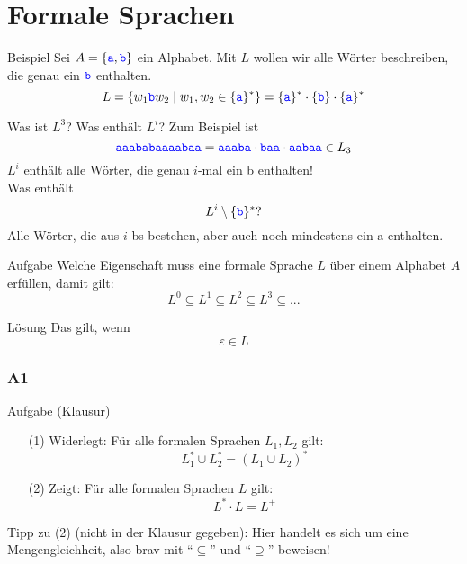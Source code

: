 \section{Formale Sprachen}

\begin{frame}{Beispiel}
	Sei $A = \left\{\hbox{\textcolor{blue}{\texttt{a}}},\hbox{\textcolor{blue}{\texttt{b}}}\right\}$ ein Alphabet. Mit $L$ wollen wir alle Wörter beschreiben, die genau ein $\hbox{\textcolor{blue}{\texttt{b}}}$ enthalten. \\ \pause
	$$ L = \left\{w_1 \hbox{\textcolor{blue}{\texttt{b}}} w_2 \mid w_1, w_2 \in \{\hbox{\textcolor{blue}{\texttt{a}}}\}^\ast \right\} = \{\hbox{\textcolor{blue}{\texttt{a}}}\}^\ast \cdot \{\hbox{\textcolor{blue}{\texttt{b}}} \} \cdot \{\hbox{\textcolor{blue}{\texttt{a}}}\}^\ast$$
	
	Was ist $L^3$? Was enthält $L^i$? \pause
	Zum Beispiel ist $$\hbox{\textcolor{blue}{\texttt{aaababaaaabaa}}} = \hbox{\textcolor{blue}{\texttt{aaaba}}} \cdot \hbox{\textcolor{blue}{\texttt{baa}}} \cdot \hbox{\textcolor{blue}{\texttt{aabaa}}} \in L_3$$ \pause
	$L^i$ enthält alle Wörter, die genau $i$-mal ein \word b enthalten! \\[1em]
	
	Was enthält $$L^i \setminus \{\hbox{\textcolor{blue}{\texttt{b}}}\}^\ast ?$$ \pause
	Alle Wörter, die aus $i$ \word bs bestehen, aber auch noch mindestens ein \word a enthalten. \\
\end{frame}

\begin{frame}{Aufgabe}
	Welche Eigenschaft muss eine formale Sprache $L$ über einem Alphabet
	$A$ erfüllen, damit gilt: $$ L^0 \subseteq L^1 \subseteq L^2 \subseteq L^3 \subseteq ... $$
	
	\pause
	\begin{block}{Lösung}
		Das gilt, wenn $$ \varepsilon \in L $$
	\end{block}
	
\end{frame}

\subsubsection{A1}
\begin{frame}{Aufgabe (Klausur) }
		\begin{itemize}
			\item[(1)] Widerlegt: Für alle formalen Sprachen $L_1 , L_2$ gilt: 
			$$L_1^\ast \cup L_2^\ast = (L_1 \cup L_2 )^\ast$$
			
			\item[(2)] Zeigt: Für alle formalen Sprachen $L$ gilt: 
				$$L^\ast \cdot L = L^+ $$ 
	\end{itemize}

	Tipp zu (2) (nicht in der Klausur gegeben): Hier handelt es sich um eine Mengengleichheit, also brav mit \enquote{$\subseteq$} und \enquote{$\supseteq$} beweisen! \smiley 
\end{frame}


